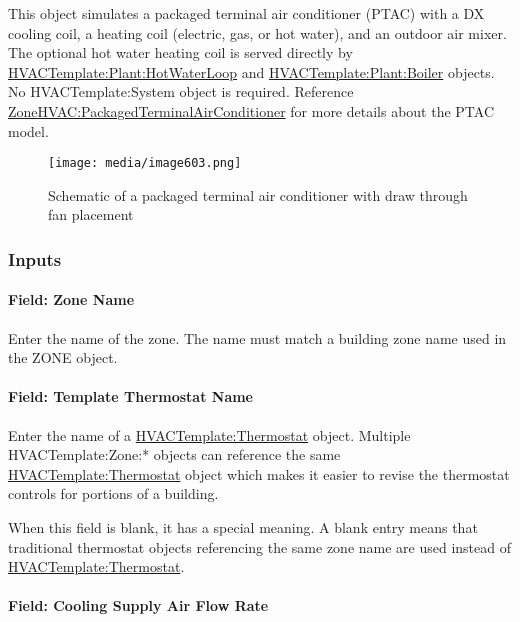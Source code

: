 This object simulates a packaged terminal air conditioner (PTAC) with a DX cooling coil, a heating coil (electric, gas, or hot water), and an outdoor air mixer. The optional hot water heating coil is served directly by \hyperref[hvactemplateplanthotwaterloop]{HVACTemplate:Plant:HotWaterLoop} and \hyperref[hvactemplateplantboiler]{HVACTemplate:Plant:Boiler} objects. No HVACTemplate:System object is required. Reference \hyperref[zonehvacpackagedterminalairconditioner]{ZoneHVAC:PackagedTerminalAirConditioner} for more details about the PTAC model.

\begin{figure}[hbtp] %
\centering
\texttt{[image: media/image603.png]}
\caption{Schematic of a packaged terminal air conditioner with draw through fan placement \protect \label{fig:schematic-of-a-packaged-terminal-air}}
\end{figure}

\subsubsection{Inputs}\label{inputs-4-016}

\paragraph{Field: Zone Name}\label{field-zone-name-3-001}

Enter the name of the zone. The name must match a building zone name used in the ZONE object.

\paragraph{Field: Template Thermostat Name}\label{field-template-thermostat-name-3}

Enter the name of a \hyperref[hvactemplatethermostat]{HVACTemplate:Thermostat} object. Multiple HVACTemplate:Zone:* objects can reference the same \hyperref[hvactemplatethermostat]{HVACTemplate:Thermostat} object which makes it easier to revise the thermostat controls for portions of a building.

When this field is blank, it has a special meaning. A blank entry means that traditional thermostat objects referencing the same zone name are used instead of \hyperref[hvactemplatethermostat]{HVACTemplate:Thermostat}.

\paragraph{Field: Cooling Supply Air Flow Rate}\label{field-cooling-supply-air-flow-rate-000}

